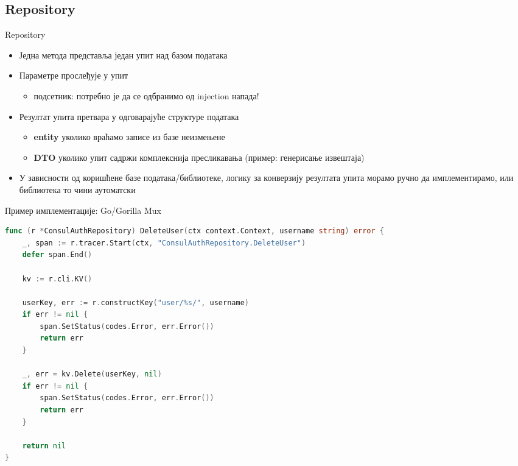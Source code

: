 \documentclass{beamer}
\begin{document}
    \subsection{Repository}
    
    \begin{frame}{Repository}
        \begin{itemize}
			\item Једна метода представља један упит над базом података
			\item Параметре прослеђује у упит
			\begin{itemize}
				\item подсетник: потребно је да се одбранимо од injection напада!
			\end{itemize}
			\item Резултат упита претвара у одговарајуће структуре података
			\begin{itemize}
				\item \textbf{entity} уколико враћамо записе из базе неизмењене
				\item \textbf{DTO} уколико упит садржи комплекснија пресликавања (пример: генерисање извештаја)
			\end{itemize}
			\item У зависности од коришћене базе података/библиотеке, логику за конверзију резултата упита морамо ручно да имплементирамо, или библиотека то чини аутоматски
        \end{itemize}
    \end{frame}
    
    \begin{frame}[fragile]{Пример имплементације: Go/Gorilla Mux}
    	\begin{adjustbox}{width=\textwidth,height=\textheight,keepaspectratio}
			\begin{lstlisting}[language=go]
func (r *ConsulAuthRepository) DeleteUser(ctx context.Context, username string) error {
	_, span := r.tracer.Start(ctx, "ConsulAuthRepository.DeleteUser")
	defer span.End()

	kv := r.cli.KV()

	userKey, err := r.constructKey("user/%s/", username)
	if err != nil {
		span.SetStatus(codes.Error, err.Error())
		return err
	}

	_, err = kv.Delete(userKey, nil)
	if err != nil {
		span.SetStatus(codes.Error, err.Error())
		return err
	}

	return nil
}
			\end{lstlisting}
		\end{adjustbox}
    \end{frame}
    
\end{document}
